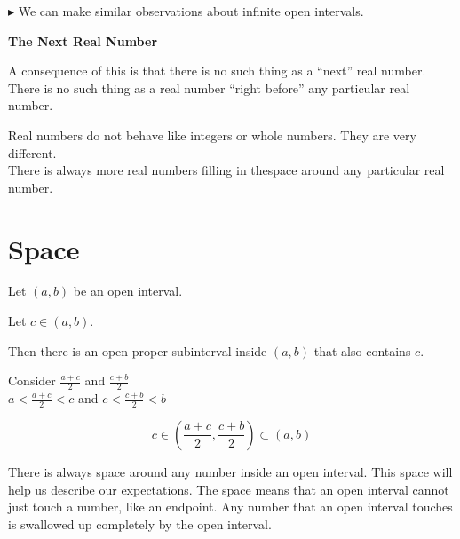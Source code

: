 \documentclass{ximera}
\begin{document}
$\blacktriangleright$ We can make similar observations about infinite open intervals. \\






\begin{idea} \textbf{\textcolor{purple!85!blue}{The Next Real Number}}


A consequence of this is that there is no such thing as a ``next'' real number. \\


There is no such thing as a real number ``right before'' any particular real number.


\end{idea}

Real numbers do not behave like integers or whole numbers.  They are very different. \\

There is always more real numbers filling in thespace around any particular real number. \\









\section*{Space}

\begin{observation} 


Let $(a,b)$ be an open interval.

Let $c \in (a,b)$.

Then there is an open proper subinterval inside $(a,b)$ that also contains $c$.

\begin{explanation}


Consider $\frac{a+c}{2}$ and  $\frac{c+b}{2}$ \\

$a < \frac{a+c}{2} < c$ and  $c < \frac{c+b}{2}  < b$



\[   c \in \left(\frac{a+c}{2} , \frac{c+b}{2} \right) \subset (a,b)              \]

\end{explanation}
\end{observation}


There is always space around any number inside an open interval.  This space will help us describe our expectations.  The space means that an open interval cannot just touch a number, like an endpoint.  Any number that an open interval touches is swallowed up completely by the open interval.
\end{document}
